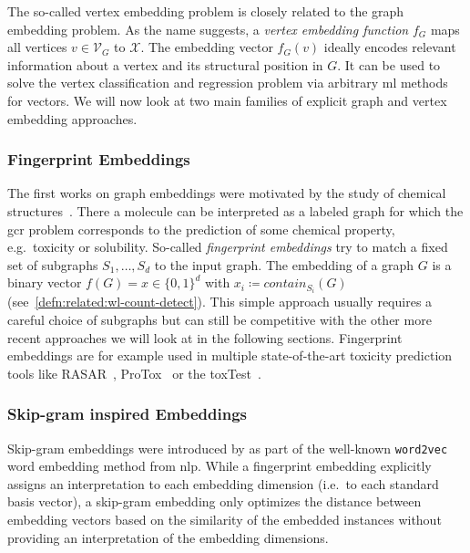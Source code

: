 The so-called vertex embedding problem is closely related to the graph embedding problem.
As the name suggests, a \textit{vertex embedding function} $f_G$ maps all vertices $v \in \mathcal{V}_G$ to $\mathcal{X}$.
The embedding vector $f_G(v)$ ideally encodes relevant information about a vertex and its structural position in $G$.
It can be used to solve the vertex classification and regression problem via arbitrary \ac{ml} methods for vectors.
We will now look at two main families of explicit graph and vertex embedding approaches.

\subsubsection{Fingerprint Embeddings}

The first works on graph embeddings were motivated by the study of chemical structures~\cite{Adamson1973}\cite{Willett1986}.
There a molecule can be interpreted as a labeled graph for which the \ac{gcr} problem corresponds to the prediction of some chemical property, e.g.\ toxicity or solubility.
So-called \textit{fingerprint embeddings} try to match a fixed set of subgraphs $S_1, \dots, S_d$ to the input graph.
The embedding of a graph $G$ is a binary vector $f(G) = x \in {\{0, 1\}}^d$ with $x_i \coloneqq \mathit{contain}_{S_i}(G)$ (see~\cref{defn:related:wl-count-detect}).
This simple approach usually requires a careful choice of subgraphs but can still be competitive with the other more recent approaches we will look at in the following sections.
Fingerprint embeddings are for example used in multiple state-of-the-art toxicity prediction tools like RASAR~\cite{Luechtefeld2018}\cite{ToxTrack}, ProTox~\cite{Drwal2014}\cite{Banerjee2018}\cite{ProTox} or the \ac{toxTest}~\cite{TEST}.

\subsubsection{Skip-gram inspired Embeddings}

Skip-gram embeddings were introduced by \citeauthor{Mikolov2013} as part of the well-known \texttt{word2vec}~\cite{Mikolov2013} word embedding method from \ac{nlp}.
While a fingerprint embedding explicitly assigns an interpretation to each embedding dimension (i.e.\ to each standard basis vector), a skip-gram embedding only optimizes the distance between embedding vectors based on the similarity of the embedded instances without providing an interpretation of the embedding dimensions.

